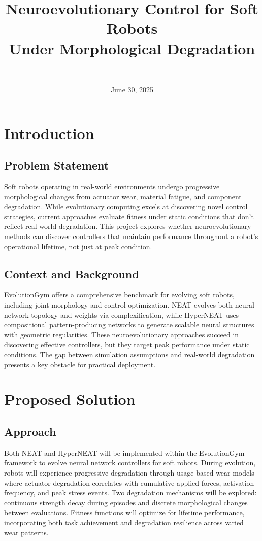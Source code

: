 \documentclass[journal,12pt,onecolumn]{IEEEtran}
\title{Neuroevolutionary Control for Soft Robots \\ Under Morphological Degradation}
\author{
   \IEEEauthorblockN{Matthew D. Branson} \\
   \IEEEauthorblockA{\textit{Department of Computer Science} \\
   \textit{Missouri State University}\\
   Springfield, MO \\
   branson773@live.missouristate.edu
   }
}
\date{June 30, 2025}
\begin{document}
\maketitle

\section{Introduction}

\subsection{Problem Statement}
Soft robots operating in real-world environments undergo progressive morphological changes from actuator wear, material fatigue, and component degradation. While evolutionary computing excels at discovering novel control strategies, current approaches evaluate fitness under static conditions that don't reflect real-world degradation. This project explores whether neuroevolutionary methods can discover controllers that maintain performance throughout a robot's operational lifetime, not just at peak condition.

\subsection{Context and Background}
EvolutionGym \cite{evogym2021} offers a comprehensive benchmark for evolving soft robots, including joint morphology and control optimization. NEAT \cite{stanley2002evolving} evolves both neural network topology and weights via complexification, while HyperNEAT \cite{stanley2009hypercube} uses compositional pattern-producing networks to generate scalable neural structures with geometric regularities. These neuroevolutionary approaches succeed in discovering effective controllers, but they target peak performance under static conditions. The gap between simulation assumptions and real-world degradation presents a key obstacle for practical deployment.

\section{Proposed Solution}

\subsection{Approach}
Both NEAT and HyperNEAT will be implemented within the EvolutionGym framework to evolve neural network controllers for soft robots. During evolution, robots will experience progressive degradation through usage-based wear models where actuator degradation correlates with cumulative applied forces, activation frequency, and peak stress events. Two degradation mechanisms will be explored: continuous strength decay during episodes and discrete morphological changes between evaluations. Fitness functions will optimize for lifetime performance, incorporating both task achievement and degradation resilience across varied wear patterns.
\end{document}
